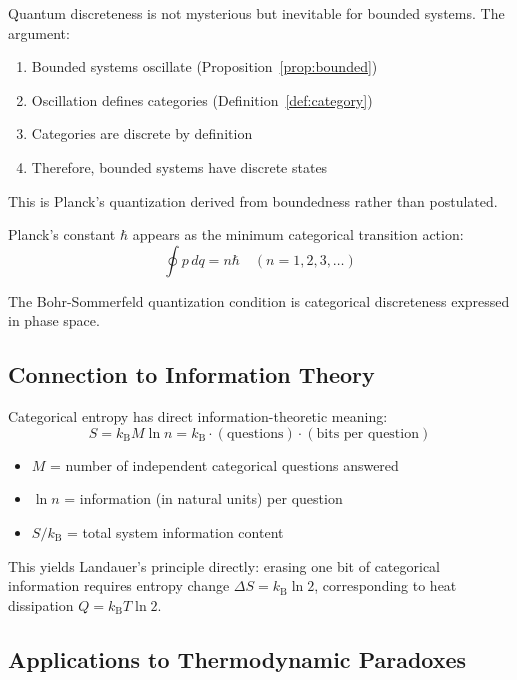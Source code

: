 \documentclass[twocolumn,10pt]{article}
\theoremstyle{definition}
\theoremstyle{remark}
\newcommand{\kB}{k_{\mathrm{B}}}
\begin{document}
Quantum discreteness is not mysterious but inevitable for bounded systems. The argument:
\begin{enumerate}
\item Bounded systems oscillate (Proposition~\ref{prop:bounded})
\item Oscillation defines categories (Definition~\ref{def:category})
\item Categories are discrete by definition
\item Therefore, bounded systems have discrete states
\end{enumerate}

This is Planck's quantization derived from boundedness rather than postulated.

Planck's constant $\hbar$ appears as the minimum categorical transition action:
\begin{equation}
\oint p \, dq = n\hbar \quad (n = 1, 2, 3, \ldots)
\end{equation}

The Bohr-Sommerfeld quantization condition is categorical discreteness expressed in phase space.

\subsection{Connection to Information Theory}

Categorical entropy has direct information-theoretic meaning:
\begin{equation}
S = \kB M \ln n = \kB \cdot (\text{questions}) \cdot (\text{bits per question})
\end{equation}

\begin{itemize}
\item $M$ = number of independent categorical questions answered
\item $\ln n$ = information (in natural units) per question
\item $S/\kB$ = total system information content
\end{itemize}

This yields Landauer's principle directly: erasing one bit of categorical information requires entropy change $\Delta S = \kB \ln 2$, corresponding to heat dissipation $Q = \kB T \ln 2$.

\subsection{Applications to Thermodynamic Paradoxes}
\end{document}

